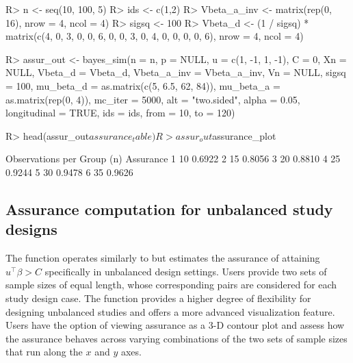 \begin{Schunk}
\begin{Sin}
R> n <- seq(10, 100, 5)
R> ids <- c(1,2)
R> Vbeta_a_inv <- matrix(rep(0, 16), nrow = 4, ncol = 4)
R> sigsq <- 100
R> Vbeta_d <- (1 / sigsq) * matrix(c(4, 0, 3, 0, 0, 6, 0, 0, 3, 0, 4, 0, 0, 0, 0, 6), 
                                nrow = 4, ncol = 4)

R> assur_out <- bayes_sim(n = n, p = NULL, u = c(1, -1, 1, -1), C = 0, Xn = NULL,
                       Vbeta_d = Vbeta_d, Vbeta_a_inv = Vbeta_a_inv,
                       Vn = NULL, sigsq = 100,
                       mu_beta_d = as.matrix(c(5, 6.5, 62, 84)),
                       mu_beta_a = as.matrix(rep(0, 4)), mc_iter = 5000,
                       alt = "two.sided", alpha = 0.05, longitudinal = TRUE, ids = ids,
                       from = 10, to = 120)
                       
R> head(assur_out$assurance_table)
R> assur_out$assurance_plot                 
\end{Sin}
\begin{Sout}
  Observations per Group (n) Assurance
1                         10    0.6922
2                         15    0.8056
3                         20    0.8810
4                         25    0.9244
5                         30    0.9478
6                         35    0.9626
\end{Sout}
\end{Schunk}



\subsection{Assurance computation for unbalanced study designs}
\label{sec:assur_unbalanced}

The  function operates similarly to
but estimates the assurance of attaining $u^{\top}\beta > C$ 
specifically in unbalanced design settings.
Users provide two sets of sample sizes of equal length,
whose corresponding pairs are considered for  
each study design case. 
The  function provides 
a higher degree of flexibility for designing unbalanced studies
and offers a more advanced visualization feature. Users
have the option of viewing assurance as a 3-D contour 
plot and assess how the assurance behaves
across varying combinations of the two 
sets of sample sizes that run along the 
$x$ and $y$ axes.

